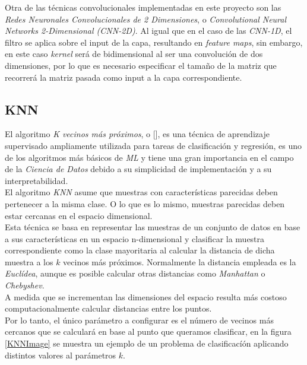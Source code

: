                     
                Otra de las técnicas convolucionales implementadas en este proyecto son las \textit{Redes Neuronales Convolucionales de 2 Dimensiones}, o \textit{Convolutional Neural Networks 2-Dimensional (CNN-2D)}. Al igual que en el caso de las \textit{CNN-1D}, el filtro se aplica sobre el input de la capa, resultando en \textit{feature maps}, sin embargo, en este caso \textit{kernel} será de bidimensional al ser una convolución de dos dimensiones, por lo que es necesario especificar el tamaño de la matriz que recorrerá la matriz pasada como input a la capa correspondiente.

            \subsection {KNN}

                El algoritmo \textit{K vecinos más próximos}, o  [\cite{KNN}], es una técnica de aprendizaje supervisado ampliamente utilizada para tareas de clasificación y regresión, es uno de los algoritmos más básicos de \textit{ML} y tiene una gran importancia en el campo de la \textit{Ciencia de Datos} debido a su simplicidad de implementación y a su interpretabilidad.\\

                El algoritmo \textit{KNN} asume que muestras con características parecidas deben pertenecer a la misma clase. O lo que es lo mismo, muestras parecidas deben estar cercanas en el espacio dimensional.\\

                Esta técnica se basa en representar las muestras de un conjunto de datos en base a sus características en un espacio n-dimensional y clasificar la muestra correspondiente como la clase mayoritaria al calcular la distancia de dicha muestra a los $k$ vecinos más próximos. Normalmente la distancia empleada es la \textit{Euclídea}, aunque es posible calcular otras distancias como \textit{Manhattan} o \textit{Chebyshev}.\\
                
                A medida que se incrementan las dimensiones del espacio resulta más costoso computacionalmente calcular distancias entre los puntos.\\


                Por lo tanto, el único parámetro a configurar es el número de vecinos más cercanos que se calculará en base al punto que queramos clasificar, en la figura \ref{KNNImage} se muestra un ejemplo de un problema de clasificacíón aplicando distintos valores al parámetros $k$.

